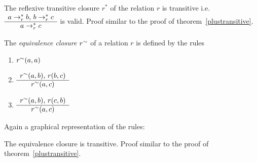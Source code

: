 \begin{theorem}
  \label{startranstive}
  The reflexive transitive closure $r^*$ of the relation $r$ is transitive
  i.e. $\begin{array}{c} a \to_r^* b, \, b \to_r^* c \\ \hline a \to_r^* c\end{array}$ is valid.
  Proof similar to the proof of theorem~\ref{plustransitive}.
\end{theorem}




\begin{definition}
  \label{def:equivalenceclosure}
  The \emph{equivalence closure} $r^\sim$ of a relation $r$ is
  defined by the rules
  \begin{enumerate}
  \item
    $r^\sim(a,a)$
  \item
    $\begin{array}{c} 
      r^\sim(a,b), \,   r(b,c) \\ \hline r^\sim(a,c)\end{array}$
  \item
    $\begin{array}{c} r^\sim(a,b), \, r(c,b) \\ \hline r^\sim(a,c)\end{array}$
  \end{enumerate}
\end{definition}

Again a graphical representation of the rules:


\begin{theorem}
  \label{eqvtransitive}
  The equivalence closure is transitive. Proof similar to the proof of
  theorem~\ref{plustransitive}.
\end{theorem}

